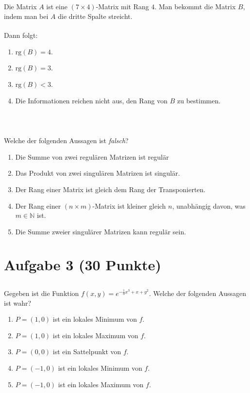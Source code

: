 \subsection*{}
Die Matrix $ A $ ist eine $ (7 \times 4) $-Matrix mit Rang $ 4 $.
Man bekommt die Matrix $ B $, indem man bei $ A $ die dritte Spalte streicht.\\
\\
Dann folgt:
\renewcommand{\labelenumi}{(\alph{enumi})}
\begin{enumerate}
	\item 
	$ \mathrm{rg}(B) = 4 $.
	\item
	$ \mathrm{rg}(B) = 3 $.
	
	\item
	$ \mathrm{rg}(B) < 3 $.
	
	\item
	Die Informationen reichen nicht aus, den Rang von $ B $ zu bestimmen.
\end{enumerate}
\ \\
\subsection*{}
Welche der folgenden Aussagen ist \textit{falsch}?
\renewcommand{\labelenumi}{(\alph{enumi})}
\begin{enumerate}
	\item 
	Die Summe von zwei regulären Matrizen ist regulär
	\item
	Das Produkt von zwei singulären Matrizen ist singulär.
	
	\item
	Der Rang einer Matrix ist gleich dem Rang der Transponierten.
	\item
	Der Rang einer $ (n \times m) $-Matrix ist kleiner gleich $ n $, unabhängig davon, was $ m \in \mathbb{N} $ ist.
	\item 
	Die Summe zweier singulärer Matrizen kann regulär sein.
\end{enumerate}

\newpage
\section*{Aufgabe 3 (30 Punkte)}
\vspace{0.4cm}

\subsection*{}
Gegeben ist die Funktion $ f(x,y) = e^{-\frac{1}{3} x^3 + x +y^2 } $.
Welche der folgenden Aussagen ist wahr?
\renewcommand{\labelenumi}{(\alph{enumi})}
\begin{enumerate}
\item 
$ P = (1,0) $ ist ein lokales Minimum von $ f $.
\item
$ P = (1,0) $ ist ein lokales Maximum von $ f $.
\item
$ P = (0,0) $ ist ein Sattelpunkt von $ f $.
\item 
$ P = (-1,0) $ ist ein lokales Minimum von $ f $.
\item
$ P = (-1,0) $ ist ein lokales Maximum von $ f $.
\end{enumerate}
\ \\

